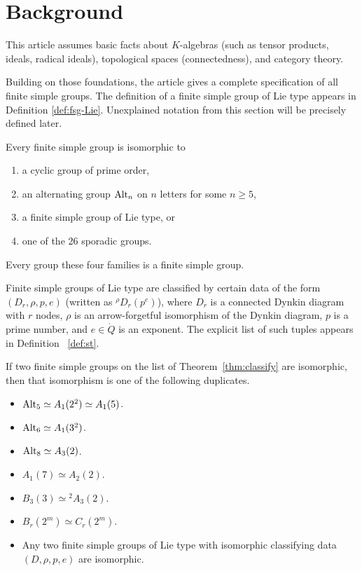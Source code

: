 \section{Background} \label{section-background}

This article assumes basic facts about $K$-algebras (such as tensor
products, ideals, radical ideals),
topological spaces (connectedness), and category theory.

Building on those foundations, the article gives a complete
specification of all finite simple groups.
The definition of a finite simple group of Lie type appears in
Definition \ref{def:fsg-Lie}.
Unexplained notation from this section will be precisely
defined later.

\begin{theorem}\label{thm:classify}
  Every finite simple group is isomorphic to 
\begin{enumerate}
\item a cyclic group of prime order,
\item an alternating group $\text{Alt}_n$ on $n$ letters for some $n\ge 5$,
\item a finite simple group of Lie type, or
\item one of the 26 sporadic groups.
\end{enumerate}
Every group these four families is a finite
simple group.
\end{theorem}

  Finite simple groups of Lie type are classified by certain data of
  the form $(D_r,\rho,p,e)$ (written as ${}^{\rho}D_r(p^e)$), where
  $D_r$ is a connected Dynkin diagram with $r$ nodes, $\rho$ is an
  arrow-forgetful isomorphism of the Dynkin diagram, $p$ is a prime
  number, and $e \in \ring{Q}$ is an exponent.  The explicit list of
  such tuples appears in Definition ~\ref{def:st}.


\begin{theorem}\label{thm:duplicate}
  If two finite simple groups on the
  list of Theorem~\ref{thm:classify} are isomorphic, then that
  isomorphism is one of the following duplicates.
  \begin{itemize}
  \item $\text{Alt}_5 \simeq A_1(2^2) \simeq A_1(5)$.
  \item $\text{Alt}_6 \simeq A_1(3^2)$.
  \item $\text{Alt}_8 \simeq A_3(2)$.
  \item $A_1(7) \simeq A_2(2)$.
  \item $B_3(3) \simeq {}^2A_3(2)$.
  \item $B_r(2^m) \simeq C_r(2^m)$.
  \item Any two finite simple groups of Lie type with
    isomorphic classifying data $(D,\rho,p,e)$ are isomorphic.
  \end{itemize}
\end{theorem}

